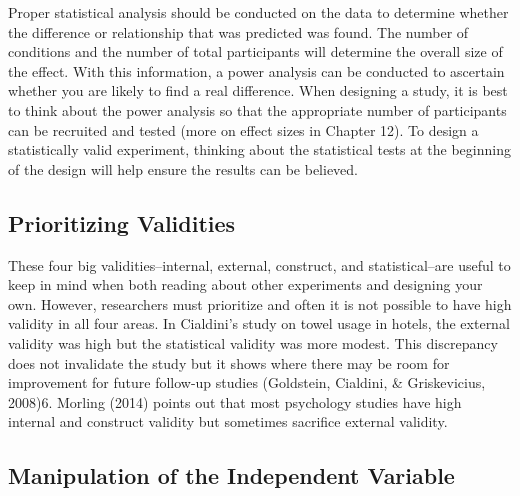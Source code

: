  

Proper statistical analysis should be conducted on the data to determine whether the difference or relationship that was predicted was found. The number of conditions and the number of total participants will determine the overall size of the effect. With this information, a power analysis can be conducted to ascertain whether you are likely to find a real difference. When designing a study, it is best to think about the power analysis so that the appropriate number of participants can be recruited and tested (more on effect sizes in Chapter 12). To design a statistically valid experiment, thinking about the statistical tests at the beginning of the design will help ensure the results can be believed.
 

 

\subsection{Prioritizing Validities}
 

 

These four big validities–internal, external, construct, and statistical–are useful to keep in mind when both reading about other experiments and designing your own. However, researchers must prioritize and often it is not possible to have high validity in all four areas. In Cialdini's study on towel usage in hotels, the external validity was high but the statistical validity was more modest. This discrepancy does not invalidate the study but it shows where there may be room for improvement for future follow-up studies (Goldstein, Cialdini, \& Griskevicius, 2008)6. Morling (2014) points out that most psychology studies have high internal and construct validity but sometimes sacrifice external validity.
 

 

\subsection{Manipulation of the Independent Variable}
 

 


